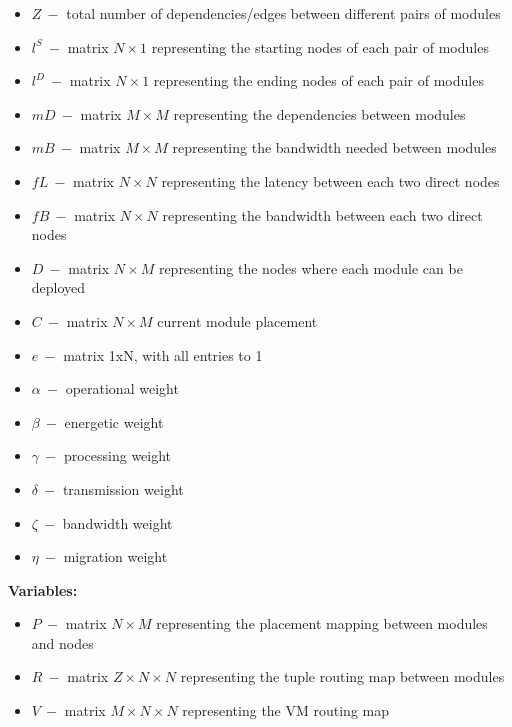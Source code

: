 \documentclass{article}
\begin{document}
\begin{itemize}
	\item $Z~-$ total number of dependencies/edges between different pairs of modules
	\item $l^S~-$ matrix $N\times 1$ representing the starting nodes of each pair of modules
	\item $l^D~-$ matrix $N\times 1$ representing the ending nodes of each pair of modules\\
	
	\item $mD~-$ matrix $M\times M$ representing the dependencies between modules
	\item $mB~-$ matrix $M\times M$ representing the bandwidth needed between modules\\
	
	\item $fL~-$ matrix $N\times N$ representing the latency between each two direct nodes
	\item $fB~-$ matrix $N\times N$ representing the bandwidth between each two direct nodes\\
	
	\item $D~-$ matrix $N\times M$ representing the nodes where each module can be deployed
	\item $C~-$ matrix $N\times M$ current module placement\\
	
	\item $e~-$ matrix 1xN, with all entries to 1\\
	
	\item $\alpha~-$ operational weight
	\item $\beta~-$ energetic weight
	\item $\gamma~-$ processing weight
	\item $\delta~-$ transmission weight
	\item $\zeta~-$ bandwidth weight
	\item $\eta~-$ migration weight
\end{itemize}

\pagebreak
\noindent\textbf{Variables:}
\begin{itemize}
	\item $P~-$ matrix $N\times M$ representing the placement mapping between modules and nodes
	\item $R~-$ matrix $Z\times N\times N$ representing the tuple routing map between modules
	\item $V~-$ matrix $M\times N\times N$ representing the VM routing map
\end{itemize}
\vspace*{12pt}
\end{document}

